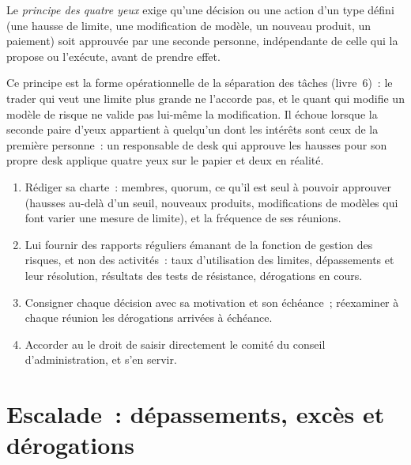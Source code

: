 \begin{definition}\label{def:fm:the-risk-management-function:foureyes}
Le \emph{principe des quatre yeux} exige qu'une décision ou une action d'un type défini (une hausse de limite, une modification de modèle, un
nouveau produit, un paiement) soit approuvée par une seconde personne, indépendante de celle qui la propose ou l'exécute, avant de prendre effet.
\end{definition}

Ce principe est la forme opérationnelle de la séparation des tâches (livre~6)~: le trader qui veut une limite plus grande ne l'accorde pas, et le quant qui
modifie un modèle de risque ne valide pas lui-même la modification. Il échoue lorsque la seconde paire d'yeux appartient à quelqu'un dont les intérêts sont ceux de la première personne~:
un responsable de desk qui approuve les hausses pour son propre desk applique quatre yeux sur le papier et deux en réalité.

\begin{method}\label{met:fm:the-risk-management-function:committee}
\begin{enumerate}
\item Rédiger sa charte~: membres, quorum, ce qu'il est seul à pouvoir approuver (hausses au-delà d'un seuil, nouveaux produits, modifications de modèles qui font varier une mesure de
limite), et la fréquence de ses réunions.
\item Lui fournir des rapports réguliers émanant de la fonction de gestion des risques, et non des activités~: taux d'utilisation des limites, dépassements et leur résolution, résultats des tests de
résistance, dérogations en cours.
\item Consigner chaque décision avec sa motivation et son échéance~; réexaminer à chaque réunion les dérogations arrivées à échéance.
\item Accorder au  le droit de saisir directement le comité du conseil d'administration, et s'en servir.
\end{enumerate}
\end{method}

\section{Escalade~: dépassements, excès et dérogations}

